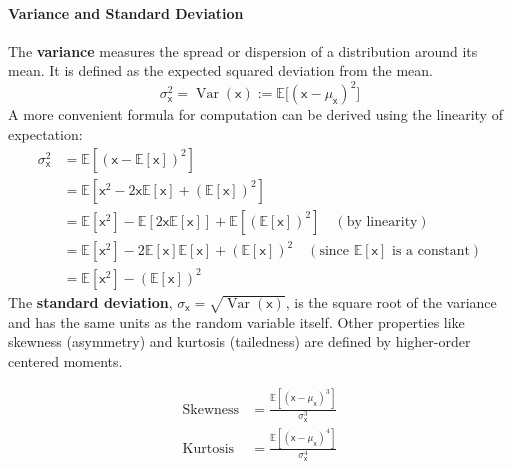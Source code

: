 \paragraph*{Variance and Standard Deviation}
The \textbf{variance} measures the spread or dispersion of a distribution around its mean. It is defined as the expected squared deviation from the mean.
\begin{equation}
    \sigma_{\mathsf{x}}^2 = \operatorname{Var}(\mathsf{x}) := \mathbb{E}\big[(\mathsf{x} - \mu_{\mathsf{x}})^2\big]
\end{equation}
A more convenient formula for computation can be derived using the linearity of expectation:
\begin{align}
    \sigma_{\mathsf{x}}^2 &= \mathbb{E}[(\mathsf{x} - \mathbb{E}[\mathsf{x}])^2] \nonumber \\
    &= \mathbb{E}[\mathsf{x}^2 - 2\mathsf{x}\mathbb{E}[\mathsf{x}] + (\mathbb{E}[\mathsf{x}])^2] \nonumber\\
    &= \mathbb{E}[\mathsf{x}^2] - \mathbb{E}[2\mathsf{x}\mathbb{E}[\mathsf{x}]] + \mathbb{E}[(\mathbb{E}[\mathsf{x}])^2] \quad (\text{by linearity}) \nonumber\\
    &= \mathbb{E}[\mathsf{x}^2] - 2\mathbb{E}[\mathsf{x}]\mathbb{E}[\mathsf{x}] + (\mathbb{E}[\mathsf{x}])^2 \quad (\text{since } \mathbb{E}[\mathsf{x}] \text{ is a constant}) \nonumber\\
    &= \mathbb{E}[\mathsf{x}^2] - (\mathbb{E}[\mathsf{x}])^2
\end{align}
The \textbf{standard deviation}, $\sigma_{\mathsf{x}} = \sqrt{\operatorname{Var}(\mathsf{x})}$, is the square root of the variance and has the same units as the random variable itself. Other properties like skewness (asymmetry) and kurtosis (tailedness) are defined by higher-order centered moments.

\begin{align}
\text{Skewness} &= \frac{\mathbb{E}[(\mathsf{x} - \mu_{\mathsf{x}})^3]}{\sigma_{\mathsf{x}}^3} \\
\text{Kurtosis} &= \frac{\mathbb{E}[(\mathsf{x} - \mu_{\mathsf{x}})^4]}{\sigma_{\mathsf{x}}^4}
\end{align}

